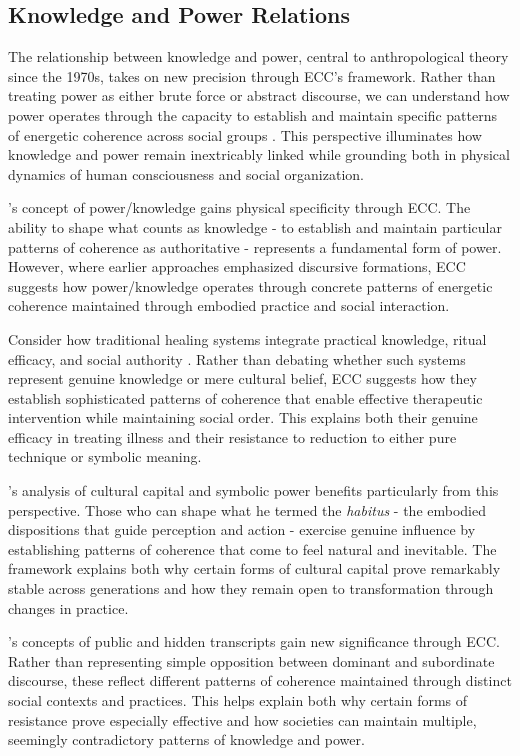 \subsection{Knowledge and Power Relations}

The relationship between knowledge and power, central to anthropological theory since the 1970s, takes on new precision through ECC's framework. Rather than treating power as either brute force or abstract discourse, we can understand how power operates through the capacity to establish and maintain specific patterns of energetic coherence across social groups \cite{foucault1980power}. This perspective illuminates how knowledge and power remain inextricably linked while grounding both in physical dynamics of human consciousness and social organization.

\cite{foucault1980power}'s concept of power/knowledge gains physical specificity through ECC. The ability to shape what counts as knowledge - to establish and maintain particular patterns of coherence as authoritative - represents a fundamental form of power. However, where earlier approaches emphasized discursive formations, ECC suggests how power/knowledge operates through concrete patterns of energetic coherence maintained through embodied practice and social interaction.

Consider how traditional healing systems integrate practical knowledge, ritual efficacy, and social authority \cite{scott1990domination}. Rather than debating whether such systems represent genuine knowledge or mere cultural belief, ECC suggests how they establish sophisticated patterns of coherence that enable effective therapeutic intervention while maintaining social order. This explains both their genuine efficacy in treating illness and their resistance to reduction to either pure technique or symbolic meaning.

\cite{bourdieu1977outline}'s analysis of cultural capital and symbolic power benefits particularly from this perspective. Those who can shape what he termed the \textit{habitus} - the embodied dispositions that guide perception and action - exercise genuine influence by establishing patterns of coherence that come to feel natural and inevitable. The framework explains both why certain forms of cultural capital prove remarkably stable across generations and how they remain open to transformation through changes in practice.

\cite{scott1990domination}'s concepts of public and hidden transcripts gain new significance through ECC. Rather than representing simple opposition between dominant and subordinate discourse, these reflect different patterns of coherence maintained through distinct social contexts and practices. This helps explain both why certain forms of resistance prove especially effective and how societies can maintain multiple, seemingly contradictory patterns of knowledge and power.

